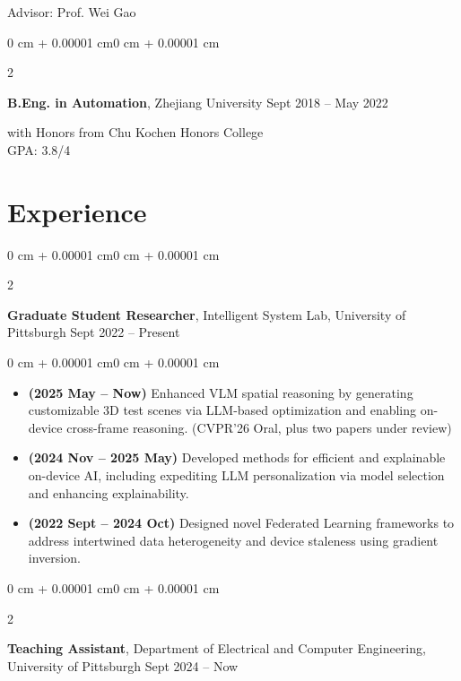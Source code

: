 \documentclass[10pt, letterpaper]{article}
\newenvironment{highlights}{
    \begin{itemize}[
        topsep=0.10 cm,
        parsep=0.10 cm,
        partopsep=0pt,
        itemsep=0pt,
        leftmargin=0 cm + 10pt
    ]
}{
    \end{itemize}
}
\newenvironment{onecolentry}{
    \begin{adjustwidth}{0 cm + 0.00001 cm}{0 cm + 0.00001 cm}
}{
    \end{adjustwidth}
}
\newenvironment{twocolentry}[2][]{
    \onecolentry
    \def\secondColumn{#2}
    \setcolumnwidth{\fill, 4.5 cm}
    \begin{paracol}{2}
}{
    \switchcolumn \raggedleft \secondColumn
    \end{paracol}
    \endonecolentry
}
\begin{document}
        \vspace{-0.1 cm}
        {Advisor: Prof. Wei Gao}
        \vspace{0.2 cm}
        \begin{twocolentry}{
            Sept 2018 -- May 2022
        }
            \textbf{B.Eng. in Automation}, Zhejiang University\end{twocolentry}

        \vspace{0.05 cm}
        {with Honors from Chu Kochen Honors College\\}
        {GPA: 3.8/4}

    \section{Experience}

        \begin{twocolentry}{
            Sept 2022 -- Present
        }
            \textbf{Graduate Student Researcher}, Intelligent System Lab, University of Pittsburgh\end{twocolentry}

        \vspace{0.10 cm}
        \begin{onecolentry}
            \begin{highlights}
                \item \textbf{(2025 May -- Now)} Enhanced VLM spatial reasoning by generating customizable 3D test scenes via LLM-based optimization and enabling on-device cross-frame reasoning. (CVPR'26 Oral, plus two papers under review)

                \item \textbf{(2024 Nov -- 2025 May)} Developed methods for efficient and explainable on-device AI, including expediting LLM personalization via model selection and enhancing explainability.

                \item \textbf{(2022 Sept -- 2024 Oct)} Designed novel Federated Learning frameworks to address intertwined data heterogeneity and device staleness using gradient inversion.
            \end{highlights}
        \end{onecolentry}


        \vspace{0.2 cm}

        \begin{twocolentry}{
            Sept 2024 -- Now
        }
            \textbf{Teaching Assistant}, Department of Electrical and Computer Engineering, University of Pittsburgh\end{twocolentry}
\end{document}
